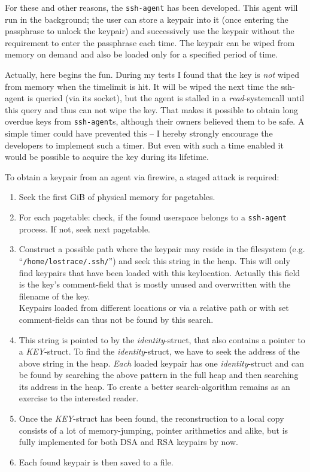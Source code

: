 For these and other reasons, the \texttt{ssh-agent} has been developed. This
agent will run in the background; the user can store a keypair into it (once
entering the passphrase to unlock the keypair) and successively use the keypair
without the requirement to enter the passphrase each time. The keypair can be
wiped from memory on demand and also be loaded only for a specified period of
time.

Actually, here begins the fun. During my tests I found that the key is
\emph{not} wiped from memory when the timelimit is hit. It will be wiped the
next time the ssh-agent is queried (via its socket), but the agent is stalled in
a \emph{read}-systemcall until this query and thus can not wipe the key. That
makes it possible to obtain long overdue keys from \texttt{ssh-agent}s, although
their owners believed them to be safe. A simple timer could have prevented this
-- I hereby strongly encourage the developers to implement such a timer. But
even with such a time enabled it would be possible to acquire the key during its
lifetime.

To obtain a keypair from an agent via firewire, a staged attack is required:

\begin{enumerate}

	\item Seek the first GiB of physical memory for pagetables.

	\item For each pagetable: check, if the found userspace belongs to a
	\texttt{ssh-agent} process. If not, seek next pagetable.

	\item Construct a possible path where the keypair may reside in the
	filesystem (e.g. ``\texttt{/home/lostrace/.ssh/}'') and seek this string
	in the heap. This will only find keypairs that have been loaded with
	this keylocation. Actually this field is the key's comment-field that is
	mostly unused and overwritten with the filename of the key. \\ Keypairs
	loaded from different locations or via a relative path or with set
	comment-fields can thus not be found by this search.
	
	\item This string is pointed to by the \emph{identity}-struct, that also
	contains a pointer to a \emph{KEY}-struct. To find the
	\emph{identity}-struct, we have to seek the address of the above string
	in the heap. \emph{Each} loaded keypair has one \emph{identity}-struct
	and can be found by searching the above pattern in the full heap and
	then searching its address in the heap.	To create a better
	search-algorithm remains as an exercise to the interested reader.

	\item Once the \emph{KEY}-struct has been found, the reconstruction to a
	local copy consists of a lot of memory-jumping, pointer arithmetics and
	alike, but is fully implemented for both DSA and RSA keypairs by now.

	\item Each found keypair is then saved to a file.
	
\end{enumerate}

